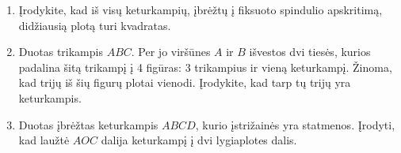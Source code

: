 \begin{enumerate}
\item Įrodykite, kad iš visų keturkampių, įbrėžtų į fiksuoto
  spindulio apskritimą, didžiausią plotą turi kvadratas.
  
\item Duotas trikampis $ABC$. Per jo viršūnes $A$ ir $B$ išvestos dvi
  tiesės, kurios padalina šitą trikampį į 4 figūras: 3 trikampius ir vieną
  keturkampį. Žinoma, kad trijų iš šių figurų plotai vienodi. Įrodykite,
  kad tarp tų trijų yra keturkampis.
\item Duotas įbrėžtas keturkampis $ABCD$, kurio įstrižainės
  yra statmenos. Įrodyti, kad laužtė $AOC$ dalija keturkampį
  į dvi lygiaplotes dalis.


\end{enumerate}
